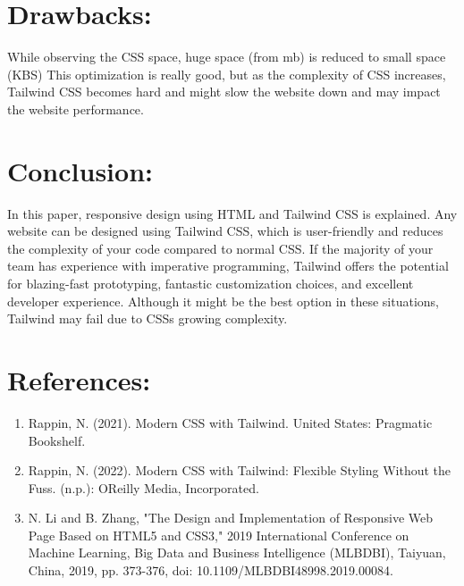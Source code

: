 \documentclass[conference]{IEEEtran}
\begin{document}
\section{Drawbacks:\label{Drawbacks}}

While observing the CSS space, huge space (from mb) is reduced to small space (KBS) This optimization is really good, but as the complexity of CSS increases, Tailwind CSS becomes hard and might slow the website down and may impact the website performance.

\section{Conclusion:\label{ acknowledgment}}

In this paper, responsive design using HTML and Tailwind CSS is explained. Any website can be designed using Tailwind CSS, which is user-friendly and reduces the complexity of your code compared to normal CSS. If the majority of your team has experience with imperative programming, Tailwind offers the potential for blazing-fast prototyping, fantastic customization choices, and excellent developer experience. Although it might be the best option in these situations, Tailwind may fail due to CSS\textquotesingle s growing complexity.


\section{References:}\label{references}

\begin{enumerate}
\def\labelenumi{\arabic{enumi}.}
\item  Rappin, N. (2021). Modern CSS with Tailwind. United States: Pragmatic
  Bookshelf.
\item  Rappin, N. (2022). Modern CSS with Tailwind: Flexible Styling Without the Fuss. (n.p.): O\textquotesingle Reilly Media, Incorporated.
\item N. Li and B. Zhang, "The Design and Implementation of Responsive Web Page Based on HTML5 and CSS3," 2019 International Conference on Machine Learning, Big Data and Business Intelligence (MLBDBI), Taiyuan, China, 2019, pp. 373-376, doi: 10.1109/MLBDBI48998.2019.00084.


\end{enumerate}
\end{document}
